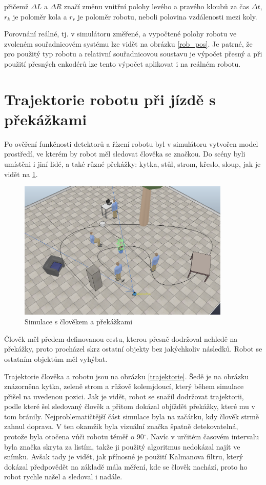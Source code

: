 \documentclass[twoside]{ctuthesis}
\theoremstyle{plain}
\theoremstyle{definition}
\theoremstyle{note}
\begin{document}
přičemž $\Delta L$ a $\Delta R$ značí změnu vnitřní polohy levého a pravého kloubů za čas $\Delta t$, $r_k$ je poloměr kola a $r_r$ je poloměr robotu, neboli polovina vzdálenosti mezi koly.

Porovnání reálné, tj. v simulátoru změřené, a vypočtené polohy robotu ve zvoleném souřadnicovém systému lze vidět na obrázku \ref{rob_pos}. Je patrné, že pro použitý typ robotu a relativní souřadnicovou soustavu je výpočet přesný a při použití přesných enkodérů lze tento výpočet aplikovat i na reálném robotu.

\section{Trajektorie robotu při jízdě s překážkami}

Po ověření funkčnosti detektorů a řízení robotu byl v simulátoru vytvořen model prostředí, ve kterém by robot měl sledovat člověka se značkou. Do scény byli umístěni i jiní lidé, a také různé překážky: kytka, stůl, strom, křeslo, sloup, jak je vidět na \ref{lidi}.
\begin{figure}[H]
	\caption{Simulace s člověkem a překážkami}

	\label{lidi}
	\includegraphics[width=0.9\textwidth]{images/5/people.png}
\end{figure}
Člověk měl předem definovanou cestu, kterou přesně dodržoval nehledě na překážky, proto procházel skrz ostatní objekty bez jakýchkoliv následků. Robot se ostatním objektům měl vyhýbat.

Trajektorie člověka a robotu jsou na obrázku \ref{trajektorie}. Šedě je na obrázku znázorněna kytka, zeleně strom a růžově kolemjdoucí, který během simulace přišel na uvedenou pozici. Jak je vidět, robot se snažil dodržovat trajektorii, podle které šel sledovaný člověk a přitom dokázal objíždět překážky, které mu v tom bránily. Nejproblematičtější část simulace byla na začátku, kdy člověk strmě zahnul doprava. V ten okamžik byla vizuální značka špatně detekovatelná, protože byla otočena vůči robotu téměř o 90$^\circ$. Navíc v určitém časovém intervalu byla značka skryta za listím, takže ji použitý algoritmus nedokázal najít ve snímku. Avšak tady je vidět, jak přínosné je použití Kalmanova filtru, který dokázal předpovědět na základě mála měření, kde se člověk nachází, proto ho robot rychle našel a sledoval i nadále.
\end{document}
